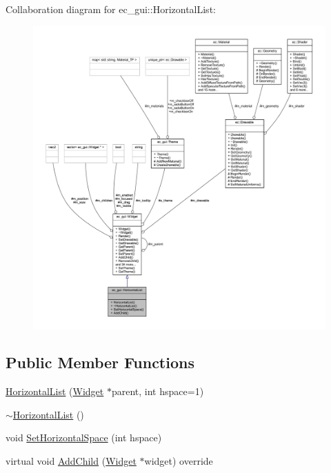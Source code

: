 Collaboration diagram for ec\+\_\+gui\+:\+:Horizontal\+List\+:
\nopagebreak
\begin{figure}[H]
\begin{center}
\leavevmode
\includegraphics[width=350pt]{classec__gui_1_1_horizontal_list__coll__graph}
\end{center}
\end{figure}
\subsection*{Public Member Functions}
\begin{DoxyCompactItemize}
\item 
\mbox{\hyperlink{classec__gui_1_1_horizontal_list_adac2ef5c6045a59399caa45bc2b41c3e}{Horizontal\+List}} (\mbox{\hyperlink{classec__gui_1_1_widget}{Widget}} $\ast$parent, int hspace=1)
\item 
\mbox{\hyperlink{classec__gui_1_1_horizontal_list_aba34eabe0c77ab8fbc267ecd2a59a2f6}{$\sim$\+Horizontal\+List}} ()
\item 
void \mbox{\hyperlink{classec__gui_1_1_horizontal_list_a2a05b26a25043bb39523edcea32547c5}{Set\+Horizontal\+Space}} (int hspace)
\item 
virtual void \mbox{\hyperlink{classec__gui_1_1_horizontal_list_abf74f325e380e8b26aeac0018995312c}{Add\+Child}} (\mbox{\hyperlink{classec__gui_1_1_widget}{Widget}} $\ast$widget) override
\end{DoxyCompactItemize}
